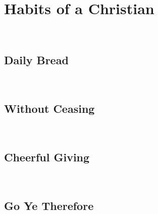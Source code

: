 \section{Habits of a Christian}
\noindent
\blindtext
\\

\subsection{Daily Bread}
\noindent
\blindtext
\\

\subsection{Without Ceasing}
\noindent
\blindtext
\\

\subsection{Cheerful Giving}
\noindent
\blindtext
\\

\subsection{Go Ye Therefore}
\noindent
\blindtext
\\

